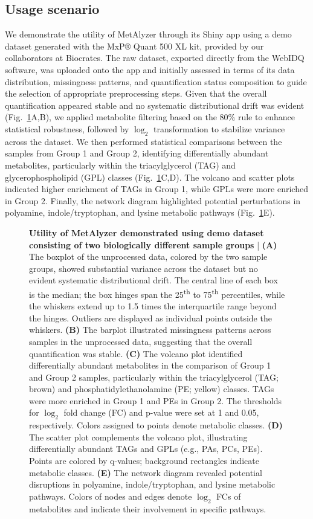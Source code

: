 \documentclass[12pt, a4paper]{article}
\begin{document}
\subsection*{\normalsize Usage scenario}
We demonstrate the utility of MetAlyzer through its Shiny app using a demo dataset generated with the MxP® Quant 500 XL kit, provided by our collaborators at Biocrates. The raw dataset, exported directly from the WebIDQ software, was uploaded onto the app and initially assessed in terms of its data distribution, missingness patterns, and quantification status composition to guide the selection of appropriate preprocessing steps. Given that the overall quantification appeared stable and no systematic distributional drift was evident (Fig.~\ref{fig:usageScenario}A,B), we applied metabolite filtering based on the 80\% rule\cite{Wei2018} to enhance statistical robustness, followed by $\log_2$ transformation to stabilize variance across the dataset. We then performed statistical comparisons between the samples from Group 1 and Group 2, identifying differentially abundant metabolites, particularly within the triacylglycerol (TAG) and glycerophospholipid (GPL) classes (Fig.~\ref{fig:usageScenario}C,D). The volcano and scatter plots indicated higher enrichment of TAGs in Group 1, while GPLs were more enriched in Group 2. Finally, the network diagram highlighted potential perturbations in polyamine, indole/tryptophan, and lysine metabolic pathways (Fig.~\ref{fig:usageScenario}E).

\begin{figure}[b!]
    \centering
    \caption{\textbf{Utility of MetAlyzer demonstrated using demo dataset consisting of two biologically different sample groups} | \textbf{(A)} The boxplot of the unprocessed data, colored by the two sample groups, showed substantial variance across the dataset but no evident systematic distributional drift. The central line of each box is the median; the box hinges span the 25\textsuperscript{th} to 75\textsuperscript{th} percentiles, while the whiskers extend up to 1.5 times the interquartile range beyond the hinges. Outliers are displayed as individual points outside the whiskers. \textbf{(B)} The barplot illustrated missingness patterns across samples in the unprocessed data, suggesting that the overall quantification was stable. \textbf{(C)} The volcano plot identified differentially abundant metabolites in the comparison of Group 1 and Group 2 samples, particularly within the triacylglycerol (TAG; brown) and phosphatidylethanolamine (PE; yellow) classes. TAGs were more enriched in Group 1 and PEs in Group 2. The thresholds for $\log_2$ fold change (FC) and p-value were set at 1 and 0.05, respectively. Colors assigned to points denote metabolic classes. \textbf{(D)} The scatter plot complements the volcano plot, illustrating differentially abundant TAGs and GPLs (e.g., PAs, PCs, PEs). Points are colored by q-values; background rectangles indicate metabolic classes. \textbf{(E)} The network diagram revealed potential disruptions in polyamine, indole/tryptophan, and lysine metabolic pathways. Colors of nodes and edges denote $\log_2$ FCs of metabolites and indicate their involvement in specific pathways.}
    \label{fig:usageScenario}
\end{figure}
\end{document}
